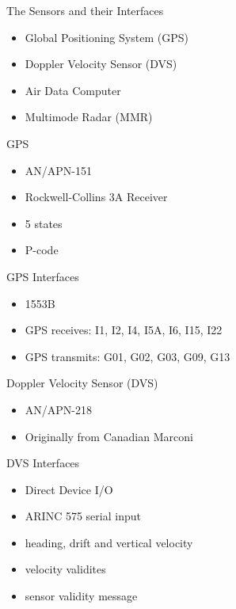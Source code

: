 \begin{frame}
The Sensors and their Interfaces
 \begin{itemize}
 \item Global Positioning System (GPS)
 \item Doppler Velocity Sensor (DVS)
 \item Air Data Computer
 \item Multimode Radar (MMR)
\end{itemize}
\end{frame}

\begin{frame}
GPS
\begin{itemize}
	\item AN/APN-151
	\item Rockwell-Collins 3A Receiver
	\item 5 states
	\item P-code
\end{itemize} 
\end{frame}

\begin{frame}
GPS Interfaces
\begin{itemize}
  \item 1553B
  \item GPS receives: I1, I2, I4, I5A, I6, I15, I22
  \item GPS transmits: G01, G02, G03, G09, G13
\end{itemize} 
\end{frame}

\begin{frame}
Doppler Velocity Sensor (DVS)
\begin{itemize}
  \item AN/APN-218
  \item Originally from Canadian Marconi
\end{itemize} 
\end{frame}

\begin{frame}
DVS Interfaces
\begin{itemize}
  \item Direct Device I/O
  \item ARINC 575 serial input
  \item heading, drift and vertical velocity
  \item velocity validites
  \item sensor validity message
\end{itemize} 
\end{frame}

